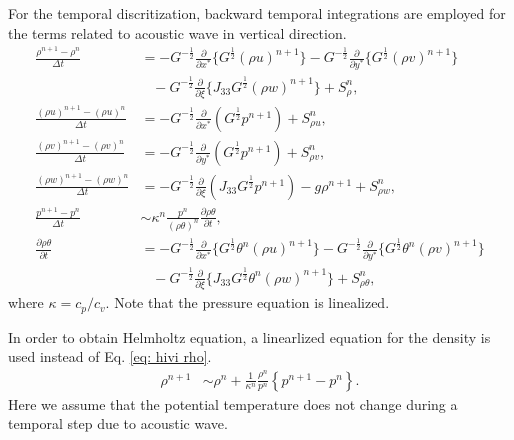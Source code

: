 For the temporal discritization, backward temporal integrations are employed for the terms related to acoustic wave in vertical direction.
\begin{align}
  \frac{\rho^{n+1}-\rho^n}{\Delta t} &=
  -G^{-\frac{1}{2}}\frac{\partial}{\partial x^*}\{G^{\frac{1}{2}}(\rho u)^{n+1}\}
  -G^{-\frac{1}{2}}\frac{\partial}{\partial y^*}\{G^{\frac{1}{2}}(\rho v)^{n+1}\} \nonumber\\ & \;\;\;
  -G^{-\frac{1}{2}}\frac{\partial}{\partial \xi}\{J_{33}G^{\frac{1}{2}}(\rho w)^{n+1}\}
  + S_\rho^n, \label{eq: hivi rho} \\
  \frac{(\rho u)^{n+1}-(\rho u)^n}{\Delta t}
  &= -G^{-\frac{1}{2}}\frac{\partial}{\partial x^*}(G^{\frac{1}{2}}p^{n+1}) + S_{\rho u}^n, \\
  \frac{(\rho v)^{n+1}-(\rho v)^n}{\Delta t}
  &= -G^{-\frac{1}{2}}\frac{\partial}{\partial y^*}(G^{\frac{1}{2}}p^{n+1}) + S_{\rho v}^n, \\
  \frac{(\rho w)^{n+1}-(\rho w)^n}{\Delta t}
  &= -G^{-\frac{1}{2}}\frac{\partial}{\partial \xi}(J_{33}G^{\frac{1}{2}}p^{n+1}) -g\rho^{n+1} + S_{\rho w}^n, \\
  \frac{p^{n+1} - p^n}{\Delta t}
  &\sim \kappa^n \frac{p^n}{(\rho\theta)^n}\frac{\partial \rho\theta}{\partial t}, \\
  \frac{\partial \rho\theta}{\partial t} &=
  -G^{-\frac{1}{2}}\frac{\partial}{\partial x^*}\{G^{\frac{1}{2}}\theta^n (\rho u)^{n+1}\}
  -G^{-\frac{1}{2}}\frac{\partial}{\partial y^*}\{G^{\frac{1}{2}}\theta^n (\rho v)^{n+1}\}  \nonumber\\ & \;\;\;
  -G^{-\frac{1}{2}}\frac{\partial}{\partial \xi}\{J_{33}G^{\frac{1}{2}}\theta^n (\rho w)^{n+1}\}
  + S_{\rho\theta}^n,
\end{align}
where $\kappa = c_p/c_v$.
Note that the pressure equation is linealized.

In order to obtain Helmholtz equation, a linearlized equation for the density is used instead of Eq. \ref{eq: hivi rho}.
\begin{align}
  \rho^{n+1} &\sim
  \rho^n + \frac{1}{\kappa^n} \frac{\rho^n}{p^n} \left\{p^{n+1}-p^n\right\}.
\end{align}
Here we assume that the potential temperature does not change during a temporal step due to acoustic wave.

